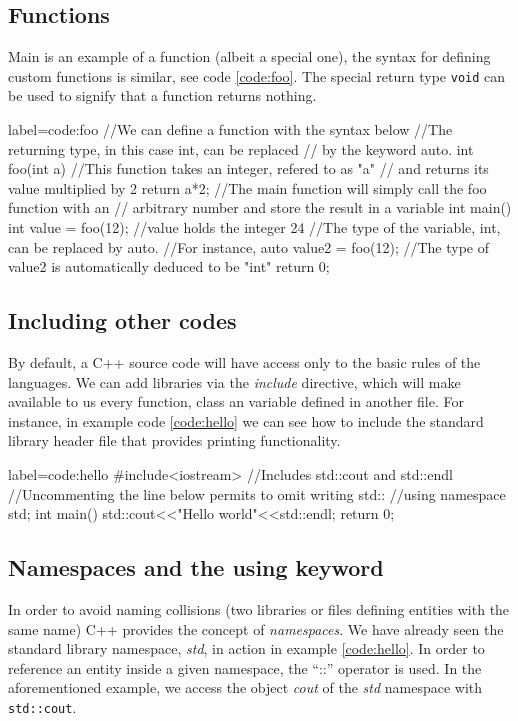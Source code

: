 \documentclass[ twoside,openright,titlepage,numbers=noenddot,%
headinclude,footinclude,cleardoublepage=empty,abstract=on,
BCOR=5mm,paper=a4,fontsize=11pt, dvipsnames
]{scrreprt}
\def\ucpp{uammd_cpp_lexer.py:UAMMDCppLexer -x}
\begin{document}
\subsection*{Functions}
Main is an example of a function (albeit a special one), the syntax for defining custom functions is similar, see code \ref{code:foo}. The special return type \texttt{void} can be used to signify that a function returns nothing.

\begin{code2} {label=code:foo}
//We can define a function with the syntax below
//The returning type, in this case int, can be replaced 
// by the keyword auto.
int foo(int a){
  //This function takes an integer, refered to as "a"
  // and returns its value multiplied by 2
  return a*2;
}
//The main function will simply call the foo function with an
// arbitrary number and store the result in a variable
int main(){
  int value = foo(12);
  //value holds the integer 24
  //The type of the variable, int, can be replaced by auto.
  //For instance,
  auto value2 = foo(12);
  //The type of value2 is automatically deduced to be "int"
  return 0;
}
\end{code2}

\subsection*{Including other codes}
By default, a C++ source code will have access only to the basic rules of the languages. We can add libraries via the \emph{include} directive, which will make available to us every function, class an variable defined in another file. For instance, in example code \ref{code:hello} we can see how to include the standard library header file that provides printing functionality.

\begin{code2} {label=code:hello}
  #include<iostream> //Includes std::cout and std::endl
  //Uncommenting the line below permits to omit writing std::
  //using namespace std;
  int main(){    
    std::cout<<"Hello world"<<std::endl;    
    return 0;  
  }
\end{code2}

\subsection*{Namespaces and the using keyword}
In order to avoid naming collisions (two libraries or files defining entities with the same name) C++ provides the concept of \emph{namespaces}. We have already seen the standard library namespace, \emph{std}, in action in example \ref{code:hello}. In order to reference an entity inside a given namespace, the ``::'' operator is used. In the aforementioned example, we access the object \emph{cout} of the \emph{std} namespace with \texttt{std::cout}.
\end{document}
